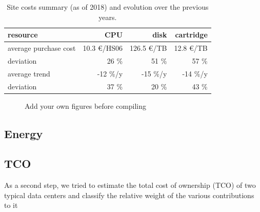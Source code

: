 \begin{table}[h]
    \centering
    \caption{Site costs summary (as of 2018) and evolution over the previous years.}
    \label{tab:sitecosts}
    \begin{tabular}{l|rrr}
        \hline
        resource & CPU & disk & cartridge \\\hline
        average purchase cost & 10.3 \euro/HS06 & 126.5 \euro/TB & 12.8 \euro/TB \\\hline
        deviation & 26 \% & 51 \% & 57 \% \\\hline
        average trend & -12 \%/y & -15 \%/y & -14 \%/y \\\hline
        deviation & 37 \% & 20 \% & 43 \%\\\hline
    \end{tabular}
\end{table}

\begin{figure}
    \caption{Add your own figures before compiling}
    \label{fig:sitecost}
\end{figure}



\subsection{\label{sec:sitecost:energy}Energy}


\subsection{\label{sec:sitecost:tco}TCO}As a second step, we tried to estimate the total cost of ownership (TCO) of two typical data centers and classify the relative
weight of the various contributions to it

